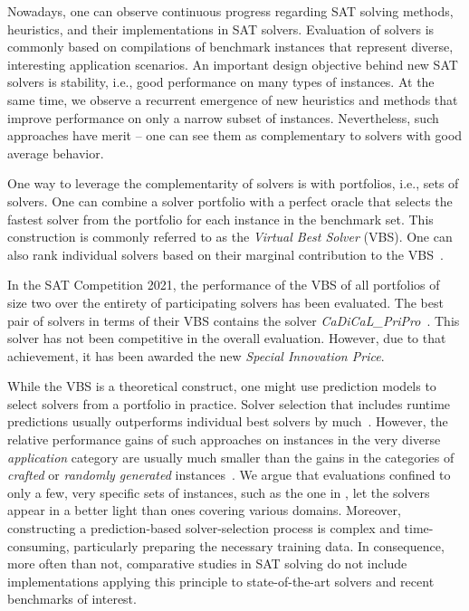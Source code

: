 \documentclass[a4paper,USenglish,pdfa]{lipics-v2021} %
\begin{document}
Nowadays, one can observe continuous progress regarding SAT solving methods, heuristics, and their implementations in SAT solvers. 
Evaluation of solvers is commonly based on compilations of benchmark instances that represent diverse, interesting application scenarios. 
An important design objective behind new SAT solvers is stability, i.e., good performance on many types of instances. 
At the same time, we observe a recurrent emergence of new heuristics and methods that improve performance on only a narrow subset of instances. 
Nevertheless, such approaches have merit -- one can see them as complementary to solvers with good average behavior. 

One way to leverage the complementarity of solvers is with portfolios, i.e., sets of solvers.
One can combine a solver portfolio with a perfect oracle that selects the fastest solver from the portfolio for each instance in the benchmark set. 
This construction is commonly referred to as the \emph{Virtual Best Solver} (VBS). 
One can also rank individual solvers based on their marginal contribution to the VBS~\cite{Xu:2012:EvalContribVBS}. 

\begin{example}
\label{ex:specialprice}
In the SAT Competition 2021, the performance of the VBS of all portfolios of size two over the entirety of participating solvers has been evaluated. 
The best pair of solvers in terms of their VBS contains the solver \emph{CaDiCaL\_PriPro}~\cite{balyo2021proceedings}.
This solver has not been competitive in the overall evaluation.
However, due to that achievement, it has been awarded the new \emph{Special Innovation Price}.
\end{example}

While the VBS is a theoretical construct, one might use prediction models to select solvers from a portfolio in practice.
Solver selection that includes runtime predictions usually outperforms individual best solvers by much~\cite{xu2008satzilla}. 
However, the relative performance gains of such approaches on instances in the very diverse \emph{application} category are usually much smaller than the gains in the categories of \emph{crafted} or \emph{randomly generated} instances~\cite{Xu:2012:EvalContribVBS,Collautti:2013:SNNAP}. 
We argue that evaluations confined to only a few, very specific sets of instances, such as the one in \cite{Kadioglu:2010:ISAC}, let the solvers appear in a better light than ones covering various domains. 
Moreover, constructing a prediction-based solver-selection process is complex and time-consuming, particularly preparing the necessary training data.
In consequence, more often than not, comparative studies in SAT solving do not include implementations applying this principle to state-of-the-art solvers and recent benchmarks of interest.
\end{document}
